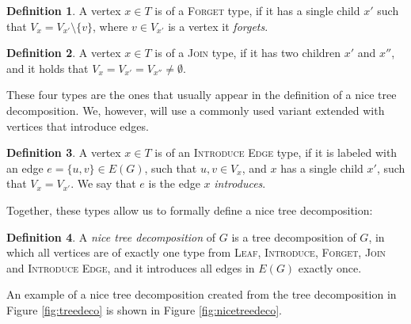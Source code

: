 \documentclass[thesis=M,english,hidelinks]{FITthesis}[2012/10/20]
\theoremstyle{definition}
\newtheorem{definition}{Definition}
\begin{document}
\begin{definition}
    A vertex $x \in T$ is of a \textsc{Forget} type, if it has a single child $x'$
    such that $V_x = V_{x'} \setminus \{v\}$, where $v \in V_{x'}$ is a vertex it \emph{forgets}.
\end{definition}

\begin{definition}
    A vertex $x \in T$ is of a \textsc{Join} type, if it has two children $x'$ and $x''$, and it holds that $V_x =
    V_{x'} = V_{x''} \neq \emptyset$.
\end{definition}

These four types are the ones that usually appear in the definition of a nice tree decomposition. We, however, will use
a commonly used variant extended with vertices that introduce edges.

\begin{definition}
    \label{def:introedge}
    A vertex $x \in T$ is of an \textsc{Introduce Edge} type, if it is labeled with an edge $e = \{u, v\} \in E(G)$, such
    that $u, v \in V_x$, and $x$ has a single child $x'$, such that $V_x = V_{x'}$. We say that $e$ is the edge $x$
    \emph{introduces}.
\end{definition}

Together, these types allow us to formally define a nice tree decomposition:

\begin{definition}
    A \emph{nice tree decomposition} of $G$ is a tree decomposition of $G$, in which all vertices are of exactly one
    type from \textsc{Leaf}, \textsc{Introduce}, \textsc{Forget}, \textsc{Join} and \textsc{Introduce Edge}, and it
    introduces all edges in $E(G)$ exactly once.
\end{definition}

An example of a nice tree decomposition created from the tree decomposition in Figure \ref{fig:treedeco} is shown in Figure
\ref{fig:nicetreedeco}.
\end{document}
